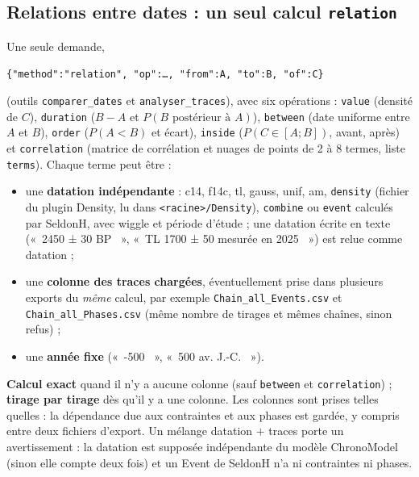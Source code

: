 \documentclass[11pt,a4paper]{article}
\providecommand{\og}{«~}\providecommand{\fg}{\unskip~»}
\newcommand{\code}[1]{\texttt{\small #1}}
\begin{document}
\subsection{Relations entre dates : un seul calcul \code{relation}}\label{sec:relation}
Une seule demande,
\begin{center}\code{\{"method":"relation", "op":…, "from":A, "to":B, "of":C\}}\end{center}
(outils \code{comparer\_dates} et \code{analyser\_traces}), avec six opérations : \code{value} (densité de $C$), \code{duration} ($B-A$ et
$P(B \text{ postérieur à } A)$), \code{between} (date uniforme entre $A$ et $B$), \code{order} ($P(A<B)$ et écart),
\code{inside} ($P(C \in [A ; B])$, avant, après) et \code{correlation} (matrice de corrélation et nuages de points de 2 à
8 termes, liste \code{terms}). Chaque terme peut être :
\begin{itemize}[leftmargin=*]
\item une \textbf{datation indépendante} : c14, f14c, tl, gauss, unif, am, \code{density} (fichier du plugin Density,
  lu dans \code{<racine>/Density}), \code{combine} ou \code{event} calculés par SeldonH, avec wiggle et période d'étude ;
  une datation écrite en texte (\og 2450 ± 30 BP \fg, \og TL 1700 ± 50 mesurée en 2025 \fg) est relue comme datation ;
\item une \textbf{colonne des traces chargées}, éventuellement prise dans plusieurs exports du \emph{même} calcul,
  par exemple \code{Chain\_all\_Events.csv} et \code{Chain\_all\_Phases.csv} (même nombre de tirages et mêmes
  chaînes, sinon refus) ;
\item une \textbf{année fixe} (\og -500 \fg, \og 500 av. J.-C. \fg).
\end{itemize}
\textbf{Calcul exact} quand il n'y a aucune colonne (sauf \code{between} et \code{correlation}) ; \textbf{tirage par
tirage} dès qu'il y a une colonne. Les colonnes sont prises telles quelles : la dépendance due aux contraintes et aux
phases est gardée, y compris entre deux fichiers d'export. Un mélange datation $+$ traces porte un avertissement : la
datation est supposée indépendante du modèle ChronoModel (sinon elle compte deux fois) et un Event de SeldonH n'a ni
contraintes ni phases.
\end{document}
